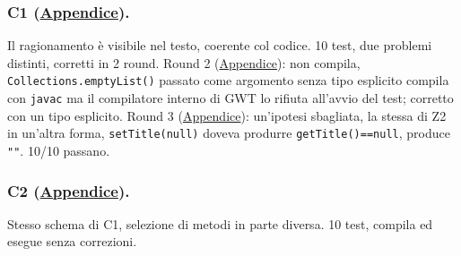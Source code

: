 \subsubsection{C1 (\hyperref[prompt:ld-c1]{Appendice}).}
Il ragionamento è visibile nel testo, coerente col codice. 10 test, due problemi distinti,
corretti in 2 round. Round 2 (\hyperref[prompt:ld-c1-r2]{Appendice}): non compila,
\texttt{Collections.emptyList()} passato come argomento senza tipo esplicito compila con
\texttt{javac} ma il compilatore interno di GWT lo rifiuta all'avvio del test; corretto con un
tipo esplicito. Round 3 (\hyperref[prompt:ld-c1-r3]{Appendice}): un'ipotesi sbagliata, la stessa
di Z2 in un'altra forma, \texttt{setTitle(null)} doveva produrre \texttt{getTitle()==null},
produce \texttt{""}. 10/10 passano.

\subsubsection{C2 (\hyperref[prompt:ld-c2]{Appendice}).}
Stesso schema di C1, selezione di metodi in parte diversa. 10 test, compila ed esegue senza
correzioni.
